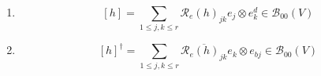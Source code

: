 \documentclass[aps,preprint]{revtex4}%
\begin{document}
\begin{enumerate}
\begin{enumerate}
\item
\begin{equation}
\left[  h\right]  =%
{\displaystyle\sum\limits_{1\leq j,k\leq r}}
\mathcal{R}_{e}\left(  h\right)  _{jk}e_{j}\otimes e_{k}^{d}\in\mathcal{B}%
_{00}\left(  V\right)
\end{equation}


\item
\begin{equation}
\left[  h\right]  ^{\dagger}=%
{\displaystyle\sum\limits_{1\leq j,k\leq r}}
\overline{\mathcal{R}_{e}\left(  h\right)  _{jk}}e_{k}\otimes e_{bj}%
\in\mathcal{B}_{00}\left(  V\right)
\end{equation}



\end{enumerate}
\end{enumerate}
\end{document}
